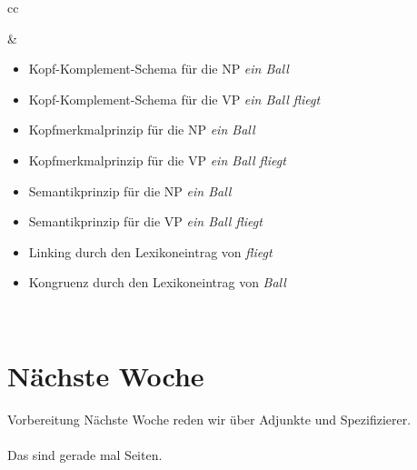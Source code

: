\begin{frame}
\begin{tabular}[h]{cc}
\begin{minipage}{0.28\textwidth}
{
      }
    \end{minipage} & %
    \begin{minipage}{0.68\textwidth}
      \begin{itemize}[<+->]
        \item \alert<3>{Kopf-Komplement-Schema für die NP \textit{ein Ball}}
        \item \alert<4>{Kopf-Komplement-Schema für die VP \textit{ein Ball fliegt}}
        \item \alert<5>{Kopfmerkmalprinzip} für die NP \textit{ein Ball}
        \item \alert<6>{Kopfmerkmalprinzip} für die VP \textit{ein Ball fliegt}
        \item \alert<7>{Semantikprinzip} für die NP \textit{ein Ball}
        \item \alert<8>{Semantikprinzip} für die VP \textit{ein Ball fliegt}
          \Zeile
        \item \alert<9>{Linking durch den Lexikoneintrag von \textit{fliegt}}
        \item \alert<10>{Kongruenz durch den Lexikoneintrag von \textit{Ball}}
      \end{itemize}
    \end{minipage} \\
  \end{tabular}
  \onslide<+->
\end{frame}

\section{Nächste Woche}

\begin{frame}
  {Vorbereitung}
  \onslide<+->
  \onslide<+->
  \centering 
  \large
  Nächste Woche reden wir über Adjunkte und Spezifizierer.\\
  \onslide<+->
  \Zeile
  \\
  \onslide<+->
  \Viertelzeile
  Das sind gerade mal  Seiten.
\end{frame}
